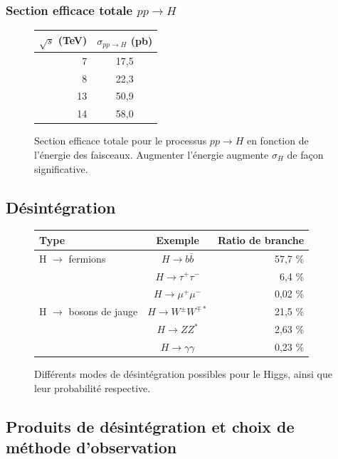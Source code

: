 \documentclass[11pt]{article} %
\begin{document}
\subsubsection{Section efficace totale $pp \to H$}

\begin{figure}[H]
      \centering
\begin{tabular}{|r|c|} 
   \hline
   $\sqrt{s}$ (TeV) & $\sigma_{pp \to H}$ (pb) \\
    \hline
   7 &  17,5\\
\hline
   8 & 22,3 \\
\hline
   13 & 50,9  \\
\hline
   14 & 58,0 \\
  \hline
\end{tabular}
\caption{Section efficace totale pour le processus $pp \to H$ en fonction de l'énergie des faisceaux. Augmenter l'énergie augmente $\sigma_H$ de façon significative.}
\end{figure}

\subsection{Désintégration}

\begin{figure}[H]
\centering
\begin{tabular}{|l|c|r|} 
   \hline
   Type & Exemple & Ratio de branche\\
    \hline
    H $\to$ fermions & $H \to b\bar{b} $ & 57,7 \% \\
    \cline{2-3} 
        & $H \to \tau^+\tau^-$ & 6,4 \% \\
   \cline{2-3} 
        & $H \to \mu^+\mu^-$ & 0,02 \%\\
    \hline
  H $\to$ bosons de jauge & $H \to W^{\pm}W^{\mp*}$ &21,5 \% \\
   \cline{2-3}
     & $H \to ZZ^*$ & 2,63 \% \\
   \cline{2-3}
      & $H \to \gamma \gamma$ & 0,23 \% \\
  \hline
\end{tabular}
\caption{Différents modes de désintégration possibles pour le Higgs, ainsi que leur probabilité respective. }
\end{figure}

\subsection{Produits de désintégration et choix de méthode d'observation}
\end{document}
